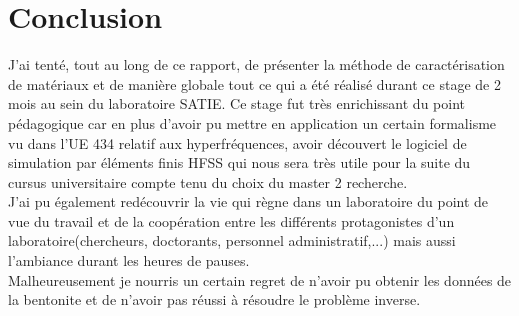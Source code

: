 \chapter{Conclusion}

J'ai tenté, tout au long de ce rapport, de présenter la méthode de caractérisation de matériaux et de manière globale tout ce qui a été réalisé durant ce stage de 2 mois au sein du laboratoire SATIE. Ce stage fut très enrichissant du point pédagogique car en plus d'avoir pu mettre en application un certain formalisme vu dans l'UE 434 relatif aux hyperfréquences,  avoir découvert le logiciel de simulation par éléments finis HFSS qui nous sera très utile pour la suite du cursus universitaire compte tenu du choix du master 2 recherche.\\
J'ai pu également redécouvrir la vie qui règne dans un laboratoire du point de vue du travail et de la coopération entre les différents protagonistes d'un laboratoire(chercheurs, doctorants, personnel administratif,...) mais aussi l'ambiance durant les heures de pauses.\\
Malheureusement je nourris un certain regret de n'avoir pu obtenir les données de la bentonite et de n'avoir pas réussi à résoudre le problème inverse.\\